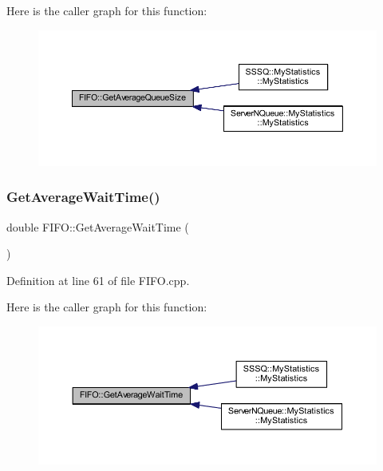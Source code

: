 Here is the caller graph for this function\+:\nopagebreak
\begin{figure}[H]
\begin{center}
\leavevmode
\includegraphics[width=350pt]{class_f_i_f_o_a739f5e90efc37fcea0f66e5548132d5f_icgraph}
\end{center}
\end{figure}
\mbox{\label{class_f_i_f_o_abf4a95cb154b2bb4eb6bb3750a6fce3d}} 
\subsubsection{\texorpdfstring{Get\+Average\+Wait\+Time()}{GetAverageWaitTime()}}
{\footnotesize\ttfamily double F\+I\+F\+O\+::\+Get\+Average\+Wait\+Time (\begin{DoxyParamCaption}{ }\end{DoxyParamCaption})}



Definition at line 61 of file F\+I\+F\+O.\+cpp.

Here is the caller graph for this function\+:\nopagebreak
\begin{figure}[H]
\begin{center}
\leavevmode
\includegraphics[width=350pt]{class_f_i_f_o_abf4a95cb154b2bb4eb6bb3750a6fce3d_icgraph}
\end{center}
\end{figure}
\mbox{\label{class_f_i_f_o_a428f7532d582435ee5710641f0f87bfd}} 
